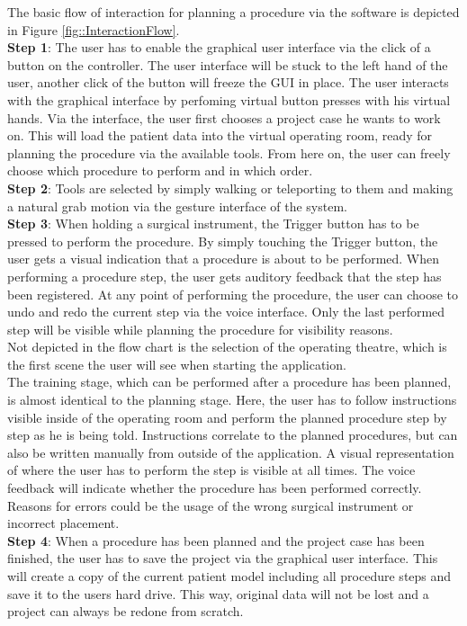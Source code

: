 The basic flow of interaction for planning a procedure via the software is depicted in Figure \ref{fig::InteractionFlow}.
\\
\textbf{Step 1}: The user has to enable the graphical user interface via the click of a button on the controller.
The user interface will be stuck to the left hand of the user, another click of the button will freeze the GUI in place.
The user interacts with the graphical interface by perfoming virtual button presses with his virtual hands.
Via the interface, the user first chooses a project case he wants to work on.
This will load the patient data into the virtual operating room, ready for planning the procedure via the available tools.
From here on, the user can freely choose which procedure to perform and in which order.
\\
\textbf{Step 2}: Tools are selected by simply walking or teleporting to them and making a natural grab motion via the gesture interface of the system.
\\
\textbf{Step 3}: When holding a surgical instrument, the Trigger button has to be pressed to perform the procedure.
By simply touching the Trigger button, the user gets a visual indication that a procedure is about to be performed.
When performing a procedure step, the user gets auditory feedback that the step has been registered.
At any point of performing the procedure, the user can choose to undo and redo the current step via the voice interface.
Only the last performed step will be visible while planning the procedure for visibility reasons.
\\
Not depicted in the flow chart is the selection of the operating theatre, which is the first scene the user will see when starting the application.
\\
The training stage, which can be performed after a procedure has been planned, is almost identical to the planning stage.
Here, the user has to follow instructions visible inside of the operating room and perform the planned procedure step by step as he is being told.
Instructions correlate to the planned procedures, but can also be written manually from outside of the application. 
A visual representation of where the user has to perform the step is visible at all times.
The voice feedback will indicate whether the procedure has been performed correctly.
Reasons for errors could be the usage of the wrong surgical instrument or incorrect placement.
\\
\textbf{Step 4}: When a procedure has been planned and the project case has been finished, the user has to save the project via the graphical user interface.
This will create a copy of the current patient model including all procedure steps and save it to the users hard drive.
This way, original data will not be lost and a project can always be redone from scratch.
